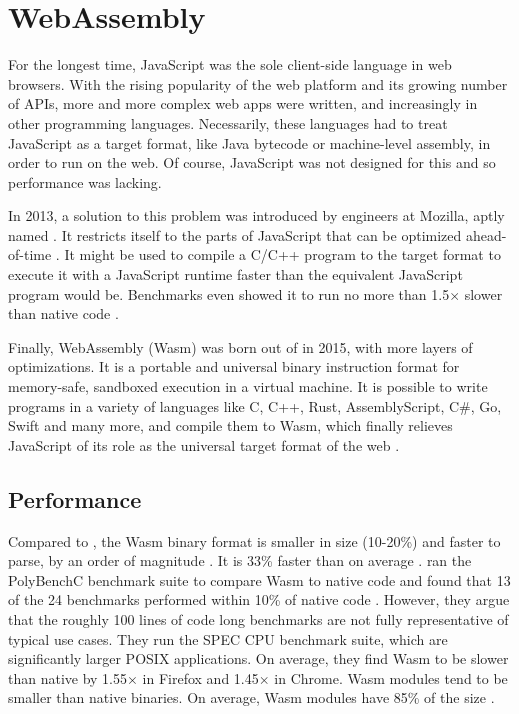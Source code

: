 \section{WebAssembly}

For the longest time, JavaScript was the sole client-side language in web browsers. With the rising popularity of the web platform and its growing number of APIs, more and more complex web apps were written, and increasingly in other programming languages. Necessarily, these languages had to treat JavaScript as a target format, like Java bytecode or machine-level assembly, in order to run on the web. Of course, JavaScript was not designed for this and so performance was lacking.

In 2013, a solution to this problem was introduced by engineers at Mozilla, aptly named . It restricts itself to the parts of JavaScript that can be optimized ahead-of-time \cite{Herman2014}. It might be used to compile a C/C++ program to the  target format to execute it with a JavaScript runtime faster than the equivalent JavaScript program would be. Benchmarks even showed it to run no more than 1.5$\times$ slower than native code \cite{Zakai2013}.

Finally, WebAssembly (Wasm) was born out of  in 2015, with more layers of optimizations. It is a portable and universal binary instruction format for memory-safe, sandboxed execution in a virtual machine.
It is possible to write programs in a variety of languages like C, C++, Rust, AssemblyScript, C\#, Go, Swift and many more, and compile them to Wasm, which finally relieves JavaScript of its role as the universal target format of the web \cite{W3C2020}.

\subsection{Performance}

Compared to , the Wasm binary format is smaller in size (10-20\%) and faster to parse, by an order of magnitude
\cite{Clark2019}. It is 33\% faster than  on average \cite{Haas2017}.
\citeauthor{NotSoFast} ran the PolyBenchC benchmark suite to compare Wasm to native code and found that 13 of the 24 benchmarks performed within 10\% of native code \cite{NotSoFast}. However, they argue that the roughly 100 lines of code long benchmarks are not fully representative of typical use cases. They run the SPEC CPU benchmark suite, which are significantly larger POSIX applications. On average, they find Wasm to be slower than native by 1.55$\times$ in Firefox and 1.45$\times$ in Chrome.
Wasm modules tend to be smaller than native  binaries. On average, Wasm modules have 85\% of the size \cite{Haas2017}.

